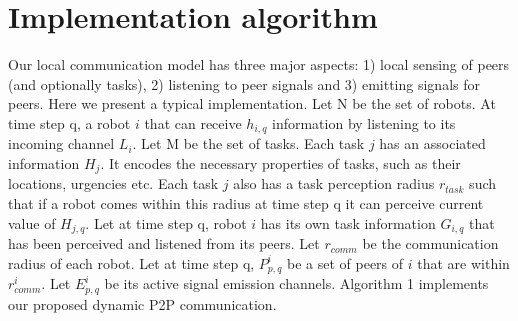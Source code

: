 \section{Implementation algorithm}
Our local communication model has three major aspects: 1) local sensing of peers (and optionally tasks), 2) listening to peer signals and 3) emitting signals for peers. Here we present a typical implementation.
Let N be the set of robots. At time step q, a robot $i$ that can receive $h_{i,q}$ information by listening to its incoming channel $L_i$. Let M be the set of tasks. Each task $j$ has an associated information $H_j$. It encodes the necessary properties of tasks, such as their locations, urgencies etc. Each task $j$ also has a task perception radius $r_{task}$ such that if a robot comes within this radius at time step q it can perceive current value of $H_{j,q}$. Let at time step q, robot $i$ has its own task information $G_{i, q}$ that has been perceived and listened from its peers. Let $r_{comm}$ be the communication radius of each robot. Let at time step q, $P_{p, q}^{i}$ be a set of peers of $i$ that are within $r_{comm}^{i}$. Let $E_{p, q}^{i}$ be its active signal emission channels. Algorithm 1
implements our proposed dynamic P2P communication.\\  

